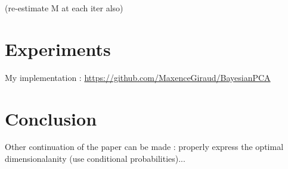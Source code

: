 \documentclass{article}
\begin{document}
(re-estimate M at each iter also)

\section{Experiments}
My implementation : \url{https://github.com/MaxenceGiraud/BayesianPCA} 

\section{Conclusion}

Other continuation of the paper can be made : properly express the optimal dimensionalanity (use conditional probabilities)...


\end{document}
